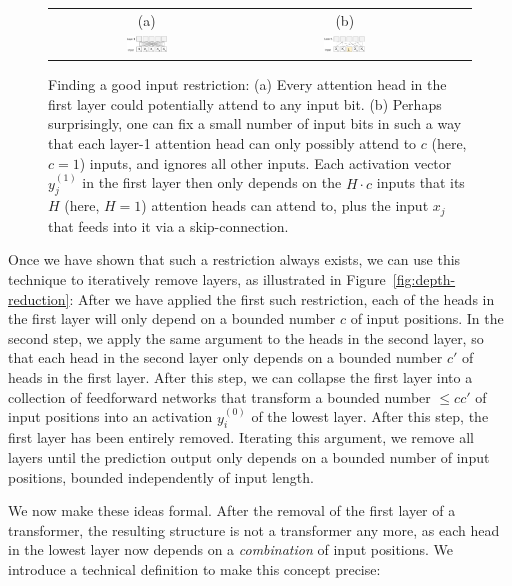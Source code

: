 \documentclass[11pt,a4paper]{article}
\begin{document}
\begin{figure}[ht]
    \centering
    \begin{tabular}{cccc}
    (a) & (b) \\
    \includegraphics[width=0.22\textwidth]{figures/restr-0b.png} &
        \includegraphics[width=0.22\textwidth]{figures/restr-2b.png}&
        \end{tabular}
	\caption{Finding a good input restriction: (a) Every attention head in the first layer could potentially attend to any input bit. (b) Perhaps surprisingly, one can fix a small number of input bits in such a way that each layer-1 attention head can only possibly attend to $c$ (here, $c=1$) inputs, and ignores all other inputs. Each activation vector $y_j^{(1)}$ in the first layer then only depends on the $H\cdot c$ inputs that its $H$ (here, $H=1$) attention heads can attend to, plus the input $x_j$ that feeds into it via a skip-connection.}
	\label{fig:restr}
\end{figure}

Once we have shown that such a restriction always exists, we can use this technique to iteratively remove layers, as illustrated in Figure~\ref{fig:depth-reduction}:
After we have applied the first such restriction, each of the heads in the first layer will only depend on a bounded number $c$ of input positions.
In the second step, we apply the same argument to the heads in the second layer, so that each head in the second layer only depends on a bounded number $c'$ of heads in the first layer.
After this step, we can collapse the first layer into a collection of feedforward networks that transform a bounded number $\leq cc'$ of input positions into an activation $y_i^{(0)}$ of the lowest layer.
After this step, the first layer has been entirely removed.
Iterating this argument, we remove all layers until the prediction output only depends on a bounded number of input positions, bounded independently of input length.

We now make these ideas formal.
After the removal of the first layer of a transformer, the resulting structure is not a transformer any more, as each head in the lowest layer now depends on a \emph{combination} of input positions.
We introduce a technical definition to make this concept precise:
\end{document}
